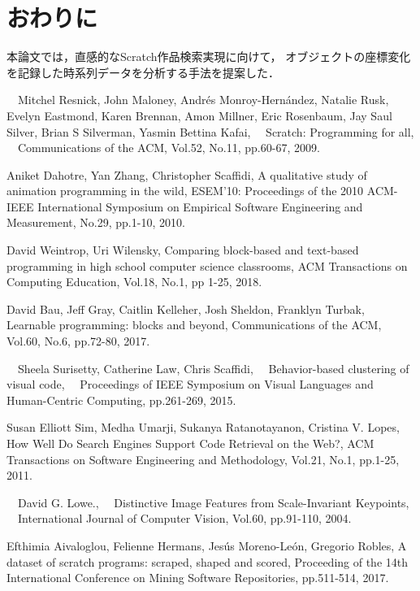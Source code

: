 \documentclass[11pt]{jreport}
\begin{document}
\chapter{おわりに}
本論文では，直感的なScratch作品検索実現に向けて，
オブジェクトの座標変化を記録した時系列データを分析する手法を提案した．



 \begin{acknowledgements}
 \end{acknowledgements}


\begin{thebibliography}{99}

　Mitchel Resnick, John Maloney, Andr\'{e}s Monroy-Hern\'{a}ndez, Natalie Rusk, Evelyn Eastmond, Karen Brennan, 
    Amon Millner, Eric Rosenbaum, Jay Saul Silver, Brian S Silverman, Yasmin Bettina Kafai,
　Scratch: Programming for all,
　Communications of the ACM, Vol.52, No.11, pp.60-67, 2009.

    Aniket Dahotre, Yan Zhang, Christopher Scaffidi,
    A qualitative study of animation programming in the wild,
    ESEM'10: Proceedings of the 2010 ACM-IEEE International Symposium on Empirical Software Engineering and Measurement,
    No.29, pp.1-10, 2010.
    
    David Weintrop, Uri Wilensky,
    Comparing block-based and text-based programming in high school computer science classrooms,
    ACM Transactions on Computing Education, Vol.18, No.1, pp 1-25, 2018.
    
    David Bau, Jeff Gray, Caitlin Kelleher, Josh Sheldon, Franklyn Turbak,
    Learnable programming: blocks and beyond,
    Communications of the ACM, Vol.60, No.6, pp.72-80, 2017. 

　Sheela Surisetty, Catherine Law, Chris Scaffidi, 
　Behavior-based clustering of visual code,
　Proceedings of IEEE Symposium on Visual Languages and Human-Centric Computing, pp.261-269, 2015.

    Susan Elliott Sim, Medha Umarji, Sukanya Ratanotayanon, Cristina V. Lopes,
    How Well Do Search Engines Support Code Retrieval on the Web?,
    ACM Transactions on Software Engineering and Methodology, Vol.21, No.1, pp.1-25, 2011.

　David G. Lowe.,
　Distinctive Image Features from Scale-Invariant Keypoints,
　International Journal of Computer Vision, Vol.60, pp.91-110, 2004.


    Efthimia Aivaloglou, Felienne Hermans, Jes\'{u}s Moreno-Le\'{o}n, Gregorio Robles,
    A dataset of scratch programs: scraped, shaped and scored,
    Proceeding of the 14th International Conference on Mining Software Repositories, pp.511-514, 2017.
　
\end{thebibliography}
\end{document}
